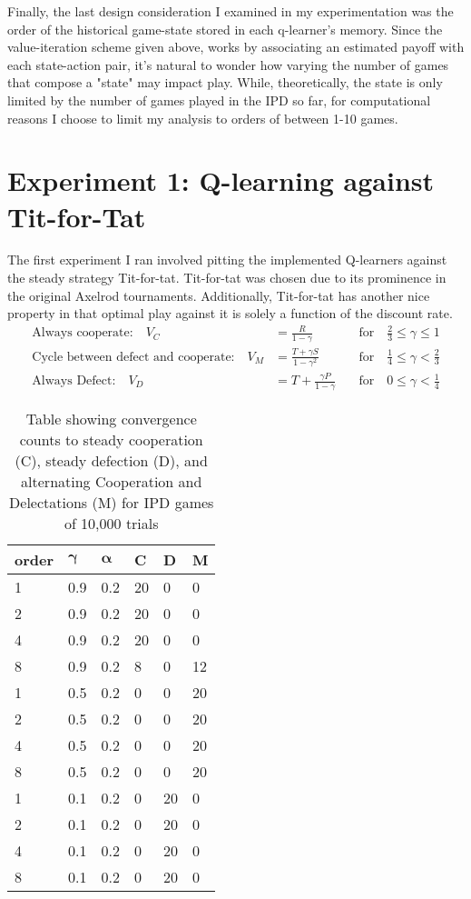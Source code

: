 \documentclass[12pt]{amsart}
\newcommand{\0}{\mat{0}}
\newcommand{\1}{\mathds{1}}
\newcommand{\bs}{\boldsymbol}
\begin{document}
Finally, the last design consideration I examined in my experimentation was the order of the historical game-state stored in each q-learner's memory.  Since the value-iteration scheme given above, works by associating an estimated payoff with each state-action pair, it's natural to wonder how varying the number of games that compose a "state" may impact play.  While, theoretically, the state is only limited by the number of games played in the IPD so far, for computational reasons I choose to limit my analysis to orders of between 1-10 games.
\section{Experiment 1: Q-learning against Tit-for-Tat}

The first experiment I ran involved pitting the implemented Q-learners against the steady strategy Tit-for-tat.  Tit-for-tat was chosen due to its prominence in the original Axelrod tournaments.  Additionally, Tit-for-tat has another nice property in that optimal play against it is solely a function of the discount rate.
\begin{align*}
\text{Always cooperate:} \quad V_C &= \frac {R}{1-\gamma} \quad &\text{for} \quad \frac 2 3 \le \gamma \le 1 \\
\text{Cycle between defect and cooperate:} \quad V_M &= \frac {T + \gamma S}{1-\gamma^2} \quad &\text{for} \quad \frac 1 4 \le \gamma < \frac 2 3 \\
\text{Always Defect:} \quad V_D &= T + \frac {\gamma P}{1-\gamma} \quad &\text{for} \quad 0 \le \gamma < \frac 1 4  
\end{align*}
\begin{center}
 \begin{table}
  \begin{tabular}{|l|l|l|l|l|l|}
    \hline
{\bf order} &  $\bs \gamma$ & $\bs \alpha$ &  {\bf C} &  {\bf D} &  {\bf M} \\ \hline 
1&0.9&0.2&20&0&0\\ \hline
2&0.9&0.2&20&0&0\\ \hline
4&0.9&0.2&20&0&0\\ \hline
8&0.9&0.2&8&0&12\\ \hline
1&0.5&0.2&0&0&20\\ \hline
2&0.5&0.2&0&0&20\\ \hline
4&0.5&0.2&0&0&20\\ \hline
8&0.5&0.2&0&0&20\\ \hline
1&0.1&0.2&0&20&0\\ \hline
2&0.1&0.2&0&20&0\\ \hline
4&0.1&0.2&0&20&0\\ \hline
8&0.1&0.2&0&20&0\\ \hline
 \end{tabular}
\caption{Table showing convergence counts to steady cooperation (C), steady defection (D), and alternating Cooperation and Delectations (M) for IPD games of 10,000 trials }
\label{table:conv}
\end{table} 
\end{center}
\end{document}
